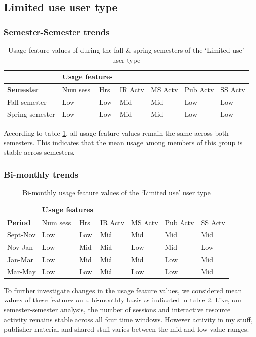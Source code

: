 \documentclass{acm_proc_article-sp}
\begin{document}
\subsection{Limited use user type}
\subsubsection{Semester-Semester trends}
\begin{table}
\caption{Usage feature values of during the fall \& spring semesters of the `Limited use' user type}
\label{cluster0month}
\begin{tabular}{|p{1.5cm}|p{0.6cm}|p{0.6cm}|p{0.6cm}|p{0.6cm}|p{0.8cm}|p{0.8cm}|}
& \multicolumn{2}{r}{\textbf{Usage features}}  \\ \hline
 \textbf{Semester} & Num sess & Hrs & IR Actv & MS Actv & Pub Actv & SS Actv \\ \hline
 Fall  semester & Low & Low  & Mid & Mid & Low & Low \\ \hline
Spring semester & Low & Low  & Mid & Mid & Low & Low \\ \hline
\end{tabular}
\end{table}
According to table \ref{cluster0month}, all usage feature values remain the same across both semesters. This indicates that the mean usage among members of this group is stable across semesters.
\subsubsection{Bi-monthly trends}
\begin{table}
\caption{Bi-monthly usage feature values of the `Limited use' user type}
\label{cluster0bimonthly}
\begin{tabular}{|p{1.5cm}|p{0.6cm}|p{0.6cm}|p{0.6cm}|p{0.6cm}|p{0.8cm}|p{0.8cm}|}
& \multicolumn{2}{r}{\textbf{Usage features}}  \\ \hline
 \textbf{Period} 
 & Num sess & Hrs & IR Actv & MS Actv & Pub Actv & SS Actv \\ \hline
Sept-Nov & Low & Low  & Mid & Mid & Mid & Mid \\ \hline
Nov-Jan & Low & Mid  & Mid & Low & Mid & Low \\ \hline
Jan-Mar & Low & Mid  & Mid & Mid & Low & Mid \\ \hline
Mar-May & Low & Low  & Mid & Low & Low & Mid \\ \hline
\end{tabular}
\end{table}
To further investigate changes in the usage feature values, we considered mean values of these features on a bi-monthly basis as indicated in table \ref{cluster0bimonthly}. Like, our semester-semester analysis, the number of sessions and interactive resource activity remains stable across all four time windows.  However activity in my stuff, publisher material and shared stuff  varies between the mid and low value ranges. 
\end{document}
